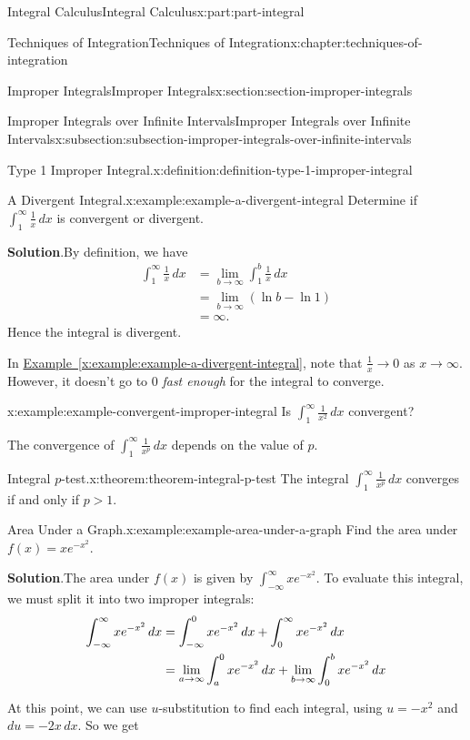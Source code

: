 \documentclass[twoside,10pt,]{book}
\newcommand{\blocktitlefont}{\relax}
\newcommand{\xreffont}{\relax}
\numberwithin{equation}{part}
\newcommand{\gt}{>}
\begin{document}
\begin{partptx}{Integral Calculus}{}{Integral Calculus}{}{}{x:part:part-integral}
\begin{chapterptx}{Techniques of Integration}{}{Techniques of Integration}{}{}{x:chapter:techniques-of-integration}
\begin{sectionptx}{Improper Integrals}{}{Improper Integrals}{}{}{x:section:section-improper-integrals}
\begin{subsectionptx}{Improper Integrals over Infinite Intervals}{}{Improper Integrals over Infinite Intervals}{}{}{x:subsection:subsection-improper-integrals-over-infinite-intervals}
\begin{definition}{Type 1 Improper Integral.}{x:definition:definition-type-1-improper-integral}
\begin{equation*}
\end{equation*}
%
\end{definition}
\begin{example}{A Divergent Integral.}{x:example:example-a-divergent-integral}%
Determine if \(\int_{1}^{\infty}\frac{1}{x}\,dx\) is convergent or divergent.%
\par\smallskip%
\noindent\textbf{\blocktitlefont Solution}.\hypertarget{g:solution:idm35150999471808}{}\quad{}By definition, we have%
\begin{align*}
\int_{1}^{\infty}\frac{1}{x}\,dx & = \lim_{b\to\infty}\int_{1}^{b}\frac{1}{x}\,dx \\
& = \lim_{b\to\infty}(\ln b - \ln 1) \\
& = \infty. 
\end{align*}
Hence the integral is divergent.%
\end{example}
In \hyperref[x:example:example-a-divergent-integral]{Example~{\xreffont\ref{x:example:example-a-divergent-integral}}}, note that \(\frac{1}{x}\to0\) as \(x\to\infty\). However, it doesn't go to \(0\) \emph{fast enough} for the integral to converge.%
\begin{example}{}{x:example:example-convergent-improper-integral}%
Is \(\int_{1}^{\infty}\frac{1}{x^{2}}\,dx\) convergent?%
\end{example}
The convergence of \(\int_{1}^{\infty}\frac{1}{x^{p}}\,dx\) depends on the value of \(p\).%
\begin{theorem}{Integral \(p\)-test.}{}{x:theorem:theorem-integral-p-test}%
The integral \(\int_{1}^{\infty}\frac{1}{x^{p}}\,dx\) converges if and only if \(p \gt 1\).%
\end{theorem}
\begin{example}{Area Under a Graph.}{x:example:example-area-under-a-graph}%
Find the area under \(f(x) = xe^{-x^{2}}\).%
\par\smallskip%
\noindent\textbf{\blocktitlefont Solution}.\hypertarget{g:solution:idm35150999462336}{}\quad{}The area under \(f(x)\) is given by \(\int_{-\infty}^{\infty}xe^{-x^{2}}\). To evaluate this integral, we must split it into two improper integrals:%
\begin{align*}
\int_{-\infty}^{\infty}xe^{-x^{2}}\,dx & = \int_{-\infty}^{0}xe^{-x^{2}}\,dx + \int_{0}^{\infty}xe^{-x^{2}}\,dx \\
& = \lim_{a\to\-\infty}\int_{a}^{0}xe^{-x^{2}}\,dx + \lim_{b\to\infty}\int_{0}^{b}xe^{-x^{2}}\,dx 
\end{align*}
%
\par
At this point, we can use \(u\)-substitution to find each integral, using \(u = -x^{2}\) and \(du = -2x\,dx\). So we get%

\end{example}
\end{subsectionptx}
\end{sectionptx}
\end{chapterptx}
\end{partptx}
\end{document}
